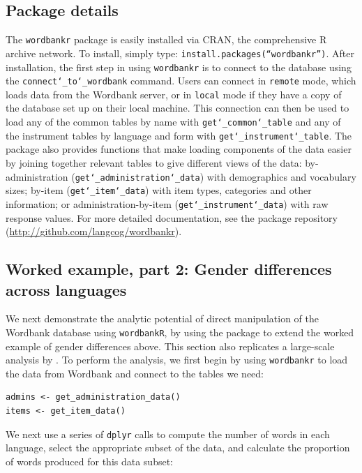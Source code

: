 \documentclass[man,noapacite]{apa}
\begin{document}
\subsection{Package details}

The \texttt{wordbankr} package is easily installed via CRAN, the comprehensive R archive network. To install, simply type: \texttt{install.packages(``wordbankr'')}. After installation, the first step in using \texttt{wordbankr} is to connect to the database using the \texttt{connect\char`_to\char`_wordbank} command. Users can connect in \texttt{remote} mode, which loads data from the Wordbank server, or in \texttt{local} mode if they have a copy of the database set up on their local machine. This connection can then be used to load any of the common tables by name with \texttt{get\char`_common\char`_table} and any of the instrument tables by language and form with \texttt{get\char`_instrument\char`_table}. The package also provides functions that make loading components of the data easier by joining together relevant tables to give different views of the data: by-administration (\texttt{get\char`_administration\char`_data}) with demographics and vocabulary sizes; by-item (\texttt{get\char`_item\char`_data}) with item types, categories and other information; or administration-by-item (\texttt{get\char`_instrument\char`_data}) with raw response values. For more detailed documentation, see the package repository (\url{http://github.com/langcog/wordbankr}).

\subsection{Worked example, part 2: Gender differences across languages}

We next demonstrate the analytic potential of direct manipulation of the Wordbank database using \texttt{wordbankR}, by using the package to extend the worked example of gender differences above. This section also replicates a large-scale analysis by . To perform the analysis, we first begin by using \texttt{wordbankr} to load the data from Wordbank and connect to the tables we need:

\begin{lstlisting}
admins <- get_administration_data()
items <- get_item_data()
\end{lstlisting}

\noindent We next use a series of \texttt{dplyr} calls to compute the number of words in each language,  select the appropriate subset of the data, and calculate the proportion of words produced for this data subset:
\end{document}
